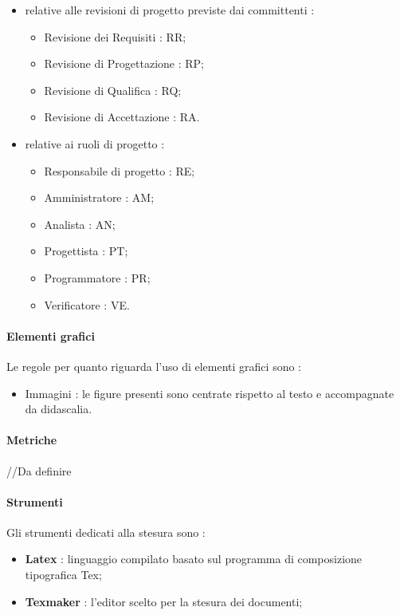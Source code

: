\begin{itemize}
\begin{itemize}
\item relative alle revisioni di progetto previste dai committenti :
\begin{itemize}
\item Revisione dei Requisiti : RR;
\item Revisione di Progettazione : RP;
\item Revisione di Qualifica : RQ;
\item Revisione di Accettazione : RA.
\end{itemize}

\item relative ai ruoli di progetto :
\begin{itemize}
\item Responsabile di progetto : RE;
\item Amministratore : AM;
\item Analista : AN;
\item Progettista : PT;
\item Programmatore : PR;
\item Verificatore : VE.
\end{itemize}
\end{itemize}
\end{itemize}

\paragraph{Elementi grafici}
Le regole per quanto riguarda l’uso di elementi grafici sono :
\begin{itemize}
\item Immagini : le figure presenti sono centrate rispetto al testo e accompagnate da didascalia.
\end{itemize}

\paragraph{Metriche}
//Da definire

\paragraph{Strumenti}
Gli strumenti dedicati alla stesura sono :
\begin{itemize}
\item \textbf{Latex} : linguaggio compilato basato sul programma di composizione tipografica Tex;
\item \textbf{Texmaker} : l’editor scelto per la stesura dei documenti;
\end{itemize}

